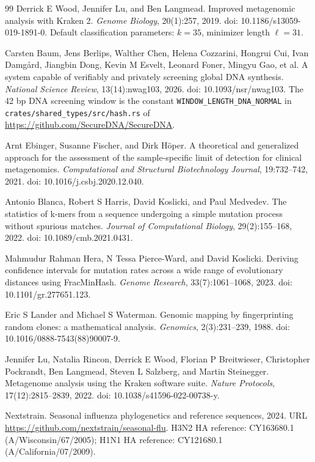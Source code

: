 \documentclass[12pt]{article}
\theoremstyle{definition}
\theoremstyle{plain}
\begin{document}
\begin{thebibliography}{99}
 Derrick E Wood, Jennifer Lu, and Ben Langmead. Improved
metagenomic analysis with Kraken 2. \emph{Genome Biology}, 20(1):257, 2019.
doi: 10.1186/s13059-019-1891-0. Default classification parameters: $k=35$,
minimizer length $\ell=31$.

 Carsten Baum, Jens Berlips, Walther Chen, Helena
Cozzarini, Hongrui Cui, Ivan Damg\aa{}rd, Jiangbin Dong, Kevin M Esvelt,
Leonard Foner, Mingyu Gao, et al. A system capable of verifiably and
privately screening global DNA synthesis. \emph{National Science Review},
13(14):nwag103, 2026. doi: 10.1093/nsr/nwag103. The 42 bp DNA screening
window is the constant \texttt{WINDOW\_LENGTH\_DNA\_NORMAL} in
\texttt{crates/shared\_types/src/hash.rs} of
\url{https://github.com/SecureDNA/SecureDNA}.

 Arnt Ebinger, Susanne Fischer, and Dirk H\"oper. A
theoretical and generalized approach for the assessment of the
sample-specific limit of detection for clinical metagenomics.
\emph{Computational and Structural Biotechnology Journal}, 19:732--742, 2021.
doi: 10.1016/j.csbj.2020.12.040.

 Antonio Blanca, Robert S Harris, David Koslicki, and Paul
Medvedev. The statistics of k-mers from a sequence undergoing a simple
mutation process without spurious matches. \emph{Journal of Computational
Biology}, 29(2):155--168, 2022. doi: 10.1089/cmb.2021.0431.

 Mahmudur Rahman Hera, N Tessa Pierce-Ward, and David
Koslicki. Deriving confidence intervals for mutation rates across a wide
range of evolutionary distances using FracMinHash. \emph{Genome Research},
33(7):1061--1068, 2023. doi: 10.1101/gr.277651.123.

 Eric S Lander and Michael S Waterman. Genomic mapping by
fingerprinting random clones: a mathematical analysis. \emph{Genomics},
2(3):231--239, 1988. doi: 10.1016/0888-7543(88)90007-9.

 Jennifer Lu, Natalia Rincon, Derrick E Wood, Florian P
Breitwieser, Christopher Pockrandt, Ben Langmead, Steven L Salzberg, and
Martin Steinegger. Metagenome analysis using the Kraken software suite.
\emph{Nature Protocols}, 17(12):2815--2839, 2022. doi:
10.1038/s41596-022-00738-y.

 Nextstrain. Seasonal influenza phylogenetics and
reference sequences, 2024. URL
\url{https://github.com/nextstrain/seasonal-flu}. H3N2 HA reference:
CY163680.1 (A/Wisconsin/67/2005); H1N1 HA reference: CY121680.1
(A/California/07/2009).


\end{thebibliography}
\end{document}
